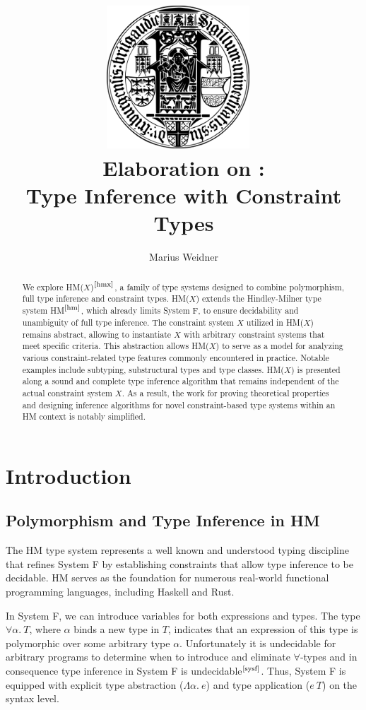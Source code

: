 \documentclass[runningheads]{llncs}
\title{\includegraphics[width=0.4\textwidth]{logo.png}~\\[1cm] Elaboration on
  \hmx:\\Type Inference with Constraint Types}
\institute{Chair of Programming Languages, University of Freiburg \\
  \email{weidner@cs.uni-freiburg.de}}
\author{Marius Weidner}
\newcommand{\hmx}{HM($X$)}
\begin{document}
\let\oldaddcontentsline\addcontentsline{}
\def\addcontentsline#1#2#3{}
\maketitle
\def\addcontentsline#1#2#3{\oldaddcontentsline{#1}{#2}{#3}}

\begin{abstract}
  We explore \hmx{}$^\text{\cite{hmx}}$, a family of type systems designed to
  combine
  polymorphism, full type inference and constraint types.
  \hmx{} extends the Hindley-Milner type system HM$^\text{\cite{hm}}$, which
  already
  limits
  System F, to ensure decidability and unambiguity of full type inference.
  The constraint system $X$ utilized in \hmx{} remains abstract, allowing
  to instantiate $X$ with arbitrary constraint systems that meet specific
  criteria.
  This abstraction allows \hmx{} to serve as a model for analyzing various
  constraint-related type features commonly encountered in practice.
  Notable examples include subtyping, substructural
  types and type classes.
  \hmx{} is presented along a sound and complete type inference algorithm that
  remains
  independent of the actual constraint system
  $X$.
  As a result, the work for proving theoretical properties and designing
  inference algorithms for novel constraint-based type systems within an
  HM context is notably simplified.
\end{abstract}

\setcounter{tocdepth}{2}
\tableofcontents
\newpage

\section{Introduction}

\subsection{Polymorphism and Type Inference in HM}
The HM type system represents a well known and understood typing discipline
that
refines System F by establishing constraints that allow type inference
to be decidable.
HM serves as the foundation for numerous real-world functional programming
languages, including Haskell and Rust.

In System F, we can introduce variables for both expressions and types.
The type $∀α. \ T$, where $α$ binds a new type in $T$,
indicates that an expression of this type is polymorphic over some
arbitrary type $α$.
Unfortunately it is undecidable for arbitrary programs to determine when to
introduce and eliminate $∀$-types and in consequence type inference in System F
is undecidable$^\text{\cite{sysf}}$.
Thus, System F is equipped with explicit type abstraction ($Λα. \ e$)
and type
application ($e \ T$) on the syntax level.
\end{document}
